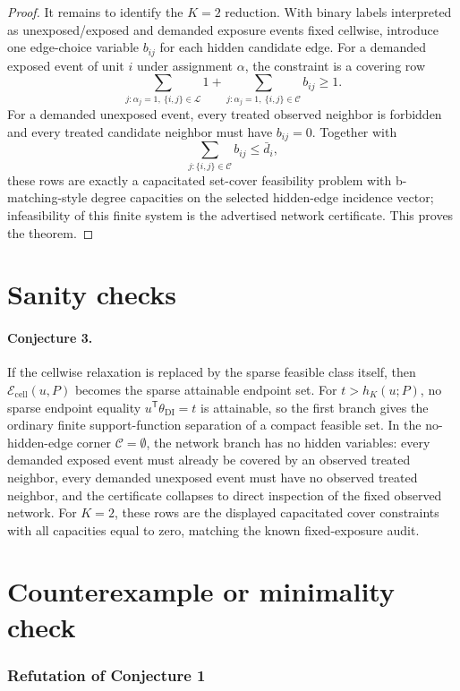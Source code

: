 \documentclass[11pt]{article}
\newcommand{\transpose}{\mathsf{T}}
\theoremstyle{definition}
\theoremstyle{plain}
\theoremstyle{remark}
\begin{document}
\begin{proof}
It remains to identify the \(K=2\) reduction.  With binary labels interpreted as unexposed/exposed and demanded exposure events fixed cellwise, introduce one edge-choice variable \(b_{ij}\) for each hidden candidate edge.  For a demanded exposed event of unit \(i\) under assignment \(\alpha\), the constraint is a covering row
\[
\sum_{j:\alpha_j=1,\ \{i,j\}\in\mathcal L}1
+
\sum_{j:\alpha_j=1,\ \{i,j\}\in\mathcal C} b_{ij}\ge1.
\]
For a demanded unexposed event, every treated observed neighbor is forbidden and every treated candidate neighbor must have \(b_{ij}=0\).  Together with
\[
\sum_{j:\{i,j\}\in\mathcal C}b_{ij}\le\bar d_i,
\]
these rows are exactly a capacitated set-cover feasibility problem with b-matching-style degree capacities on the selected hidden-edge incidence vector; infeasibility of this finite system is the advertised network certificate.  This proves the theorem.
\end{proof}

\section{Sanity checks}
\paragraph{Conjecture 3.}
If the cellwise relaxation is replaced by the sparse feasible class itself, then \(\mathcal E_{\mathrm{cell}}(u,P)\) becomes the sparse attainable endpoint set.  For \(t>h_K(u;P)\), no sparse endpoint equality \(u^\transpose\theta_{\mathrm{DI}}=t\) is attainable, so the first branch gives the ordinary finite support-function separation of a compact feasible set.  In the no-hidden-edge corner \(\mathcal C=\emptyset\), the network branch has no hidden variables: every demanded exposed event must already be covered by an observed treated neighbor, every demanded unexposed event must have no observed treated neighbor, and the certificate collapses to direct inspection of the fixed observed network.  For \(K=2\), these rows are the displayed capacitated cover constraints with all capacities equal to zero, matching the known fixed-exposure audit.

\section{Counterexample or minimality check}\label{sec:counterexample-minimality}
\subsubsection*{Refutation of Conjecture 1}
\end{document}
